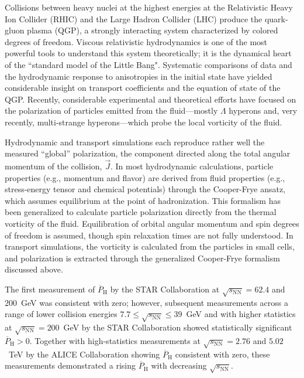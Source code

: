 \documentclass[
  reprint,
  superscriptaddress,
  amsmath,
  amssymb,
  aps,
  floatfix,
]{revtex4-2}
\newcommand{\sNN}{\sqrt{s_\mathrm{NN}}}
\newcommand{\Jsys}{\vec{J}}
\newcommand{\PHyper}{\overline{P}_\mathrm{H}}
\begin{document}
\maketitle

Collisions between heavy nuclei at the
 highest energies at the Relativistic Heavy
 Ion Collider (RHIC) and the Large
 Hadron Collider (LHC) produce the quark-gluon
 plasma (QGP), a strongly interacting system
 characterized by colored degrees of freedom\cite{Akiba:2015jwa}.
 Viscous relativistic hydrodynamics is one of
 the most powerful tools to understand
 this system theoretically\cite{Teaney:2009qa}; it is the
 dynamical heart of the ``standard model
 of the Little Bang"\cite{Heinz:2013wva}. Systematic comparisons
 of data and the hydrodynamic response
 to anisotropies in the initial state
 have yielded considerable insight on transport
 coefficients and the equation of state
 of the QGP\cite{Bernhard:2016tnd}. Recently, considerable experimental
 and theoretical efforts have focused on
 the polarization of particles emitted from
 the fluid\cite{Becattini:2020ngo}---mostly $\Lambda$ hyperons\cite{Liang:2004ph,Becattini:2007sr,Betz:2007kg,Abelev:2007zk,STAR:2017ckg,Acharya:2019ryw} and,
 very recently, multi-strange hyperons\cite{Adam:2020pti}---which probe
 the local vorticity of the fluid.

Hydrodynamic\cite{Becattini:2020ngo} and transport\cite{Vitiuk:2019rfv,Li:2017slc} simulations each reproduce
 rather well the measured ``global'' polarization,
 the component directed along the total
 angular momentum of the collision, $\Jsys$.
 In most hydrodynamic calculations, particle properties
 (e.g., momentum and flavor) are derived
 from fluid properties (e.g., stress-energy tensor
 and chemical potentials) through the Cooper-Frye
 ansatz\cite{Becattini:2020ngo}, which assumes equilibrium at the
 point of hadronization. This formalism has
 been generalized\cite{Becattini:2013fla} to calculate particle polarization
 directly from the thermal vorticity\cite{Becattini:2020ngo} of
 the fluid. Equilibration of orbital angular
 momentum and spin degrees of freedom
 is assumed, though spin relaxation times
 are not fully understood\cite{Bhadury:2020puc}. In transport
 simulations, the vorticity is calculated from
 the particles in small cells, and
 polarization is extracted through the generalized
 Cooper-Frye formalism discussed above.

The first measurement of $\PHyper$ by the STAR
 Collaboration at $\sNN=62.4$ and $200$~GeV
 was consistent with zero\cite{Abelev:2007zk}; however, subsequent
 measurements across a range of lower
 collision energies $7.7\leq\sNN\leq39$~GeV and with higher
 statistics at $\sNN=200$~GeV by the STAR
 Collaboration showed statistically significant $\PHyper>0$\cite{STAR:2017ckg,Adam:2018ivw}. Together
 with high-statistics measurements at $\sNN=2.76$ and
 $5.02$~TeV by the ALICE Collaboration showing
 $\PHyper$ consistent with zero, these measurements
 demonstrated a rising $\PHyper$ with decreasing
 $\sNN$\cite{STAR:2017ckg,Adam:2018ivw,Acharya:2019ryw}. 
\end{document}
